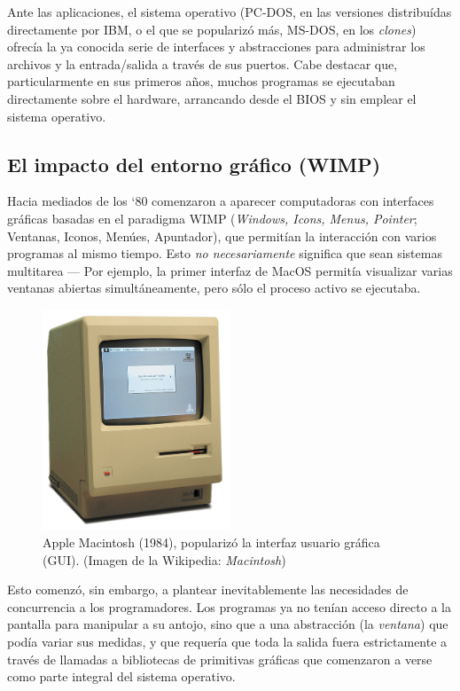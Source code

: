 \documentclass[11pt,fleqn]{book} %
\begin{document}
Ante las aplicaciones, el sistema operativo (PC-DOS, en las versiones
distribuídas directamente por IBM, o el que se popularizó más, MS-DOS,
en los \emph{clones}) ofrecía la ya conocida serie de interfaces y
abstracciones para administrar los archivos y la entrada/salida a
través de sus puertos. Cabe destacar que, particularmente en sus
primeros años, muchos programas se ejecutaban directamente sobre el
hardware, arrancando desde el BIOS y sin emplear el sistema operativo.
\subsection{El impacto del entorno gráfico (WIMP)}
\label{sec-1-4-4}


Hacia mediados de los `80 comenzaron a aparecer computadoras con
interfaces gráficas basadas en el paradigma WIMP (\emph{Windows, Icons, Menus, Pointer}; Ventanas, Iconos, Menúes, Apuntador), que permitían
la interacción con varios programas al mismo tiempo. Esto \emph{no necesariamente} significa que sean sistemas multitarea — Por ejemplo,
la primer interfaz de MacOS permitía visualizar varias ventanas
abiertas simultáneamente, pero sólo el proceso activo se
ejecutaba.

\begin{figure}[htb]
\centering
\includegraphics[width=0.5\textwidth]{./img/mac128.png}
\caption{\label{INTRO_mac128}Apple Macintosh (1984), popularizó la interfaz usuario gráfica (GUI). (Imagen de la Wikipedia: \emph{Macintosh})}
\end{figure}


Esto comenzó, sin embargo, a plantear inevitablemente las necesidades
de concurrencia a los programadores. Los programas ya no tenían acceso
directo a la pantalla para manipular a su antojo, sino que a una
abstracción (la \emph{ventana}) que podía variar sus medidas, y que
requería que toda la salida fuera estrictamente a través de llamadas a
bibliotecas de primitivas gráficas que comenzaron a verse como parte
integral del sistema operativo.
\end{document}
